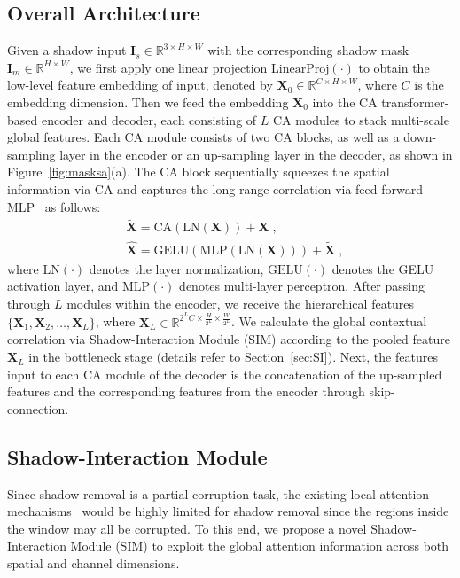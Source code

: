 \documentclass[letterpaper]{article} \usepackage{aaai23}  \usepackage{times}  \usepackage{helvet}  \usepackage{courier}  \usepackage[hyphens]{url}  \usepackage{graphicx} \urlstyle{rm} \def\UrlFont{\rm}  \usepackage{natbib}  \usepackage{caption} \frenchspacing  \setlength{\pdfpagewidth}{8.5in} \setlength{\pdfpageheight}{11in} \usepackage{algorithm}
\begin{document}
\subsection{Overall Architecture}
Given a shadow input $\mathbf{I}_s\in \mathbb{R}^{3\times H \times W}$ with the corresponding shadow mask $\mathbf{I}_m \in \mathbb{R}^{H\times W}$, we first apply one linear projection $\text{LinearProj}(\cdot)$ to obtain the low-level feature embedding of input, denoted by $\mathbf{X}_0\in\mathbb{R}^{C\times H \times W}$, where $C$ is the embedding dimension.
Then we feed the embedding $\mathbf{X}_0$ into the CA transformer-based encoder and decoder, each consisting of $L$ CA modules to stack multi-scale global features. 
Each CA module consists of two CA blocks, as well as a down-sampling layer in the encoder or an up-sampling layer in the decoder, as shown in Figure~\ref{fig:masksa}(a).
The CA block sequentially squeezes the spatial information via CA and captures the long-range correlation via feed-forward MLP~\cite{dosovitskiy2010image} as follows:
\begin{align}
      &\tilde{\mathbf{X}}= \text{CA}(\text{LN}(\mathbf{X}))+ \mathbf{X}\;,\\
       & \hat{\mathbf{X}}= \text{GELU}(\text{MLP}(\text{LN}(\mathbf{X}))) +\tilde{\mathbf{X}}\;,
\end{align}
where $\text{LN}(\cdot)$ denotes the layer normalization, $\text{GELU}(\cdot)$ denotes the GELU activation layer, and $\text{MLP}(\cdot)$ denotes multi-layer perceptron. 
After passing through $L$ modules within the encoder, we receive the hierarchical features $\{\mathbf{X}_1,\mathbf{X}_2,\ldots,\mathbf{X}_L\}$, where $\mathbf{X}_L \in \mathbb{R}^{2^LC\times \frac{H}{2^L}\times \frac{W}{2^L}}$. 
We calculate the global contextual correlation via Shadow-Interaction Module (SIM) according to the pooled feature $\mathbf{X}_L$ in the bottleneck stage (details refer to Section~\ref{sec:SI}).
Next, the features input to each CA module of the decoder is the concatenation of the up-sampled features and the corresponding features from the encoder through skip-connection.

\subsection{Shadow-Interaction Module\label{sec:SI}}
Since shadow removal is a partial corruption task, the existing local attention mechanisms~\cite{liu2021swin,wang2021uformer} would be highly limited for shadow removal since the regions inside the window may all be corrupted.
To this end, we propose a novel Shadow-Interaction Module (SIM) to exploit the global attention information across both spatial and channel dimensions.
\end{document}
